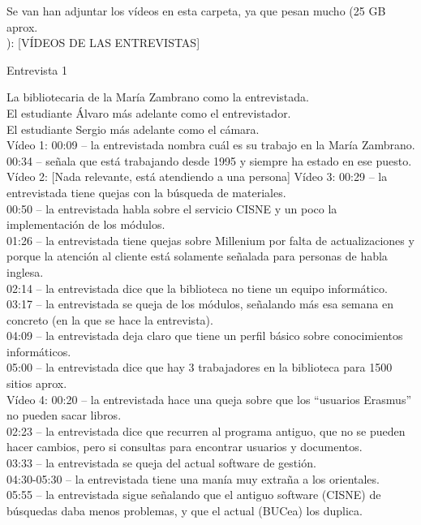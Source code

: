 \documentclass[12pt]{article}
\begin{document}
Se van han adjuntar los vídeos en esta carpeta, ya que pesan mucho (25 GB aprox.\\): [VÍDEOS DE LAS ENTREVISTAS]

Entrevista 1

La bibliotecaria de la María Zambrano como la entrevistada.\\ 
El estudiante Álvaro  más adelante como el entrevistador.\\
El estudiante Sergio más adelante como el cámara.\\
	
Vídeo 1: 
00:09 – la entrevistada nombra cuál es su trabajo en la María Zambrano.\\ 
00:34 – señala que está trabajando desde 1995 y siempre ha estado en ese puesto.\\
Vídeo 2:
[Nada relevante, está atendiendo a una persona] 
Vídeo 3:
00:29 – la entrevistada tiene quejas con la búsqueda de materiales.\\ 
00:50 – la entrevistada habla sobre el servicio CISNE y un poco la implementación de los módulos.\\ 
01:26 – la entrevistada tiene quejas sobre Millenium por falta de actualizaciones y porque la atención al cliente está solamente señalada para personas de habla inglesa.\\
02:14 – la entrevistada dice que la biblioteca no tiene un equipo informático.\\
03:17 – la entrevistada se queja de los módulos, señalando más esa semana en concreto (en la que se hace la entrevista).\\
04:09 – la entrevistada deja claro que tiene un perfil básico sobre conocimientos informáticos.\\
05:00 – la entrevistada dice que hay 3 trabajadores en la biblioteca para 1500 sitios aprox.\\
Vídeo 4: 
00:20 – la entrevistada hace una queja sobre que los “usuarios Erasmus” no pueden sacar libros.\\ 
02:23 – la entrevistada dice que recurren al programa antiguo, que no se pueden hacer cambios, pero si consultas para encontrar usuarios y documentos.\\
03:33 – la entrevistada se queja del actual software de gestión.\\
04:30-05:30 – la entrevistada tiene una manía muy extraña a los orientales.\\
05:55 – la entrevistada sigue señalando que el antiguo software (CISNE) de búsquedas daba menos problemas, y que el actual (BUCea) los duplica.\\
\end{document}
